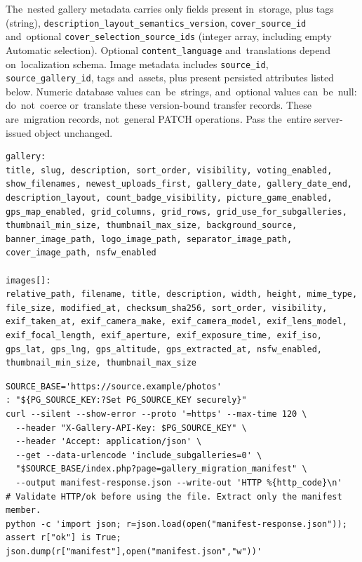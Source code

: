\documentclass[11pt,a4paper]{article}
\newcommand{\codeword}[1]{\nolinkurl{#1}}
\begin{document}
The~nested gallery metadata carries only fields present in~storage, plus tags (string),
\codeword{description_layout_semantics_version}, \codeword{cover_source_id} and~optional
\codeword{cover_selection_source_ids} (integer array, including empty Automatic selection).
Optional \codeword{content_language} and~translations depend on~localization schema. Image
metadata includes \codeword{source_id}, \codeword{source_gallery_id}, tags and~assets, plus
present persisted attributes listed below. Numeric database values can~be~strings,
and~optional values can~be~null: do~not~coerce or~translate these version-bound transfer
records. These are~migration records, not~general PATCH operations. Pass the~entire
server-issued object unchanged.

\begin{lstlisting}[language={}]
gallery:
title, slug, description, sort_order, visibility, voting_enabled,
show_filenames, newest_uploads_first, gallery_date, gallery_date_end,
description_layout, count_badge_visibility, picture_game_enabled,
gps_map_enabled, grid_columns, grid_rows, grid_use_for_subgalleries,
thumbnail_min_size, thumbnail_max_size, background_source,
banner_image_path, logo_image_path, separator_image_path,
cover_image_path, nsfw_enabled

images[]:
relative_path, filename, title, description, width, height, mime_type,
file_size, modified_at, checksum_sha256, sort_order, visibility,
exif_taken_at, exif_camera_make, exif_camera_model, exif_lens_model,
exif_focal_length, exif_aperture, exif_exposure_time, exif_iso,
gps_lat, gps_lng, gps_altitude, gps_extracted_at, nsfw_enabled,
thumbnail_min_size, thumbnail_max_size
\end{lstlisting}

\begin{lstlisting}[language={}]
SOURCE_BASE='https://source.example/photos'
: "${PG_SOURCE_KEY:?Set PG_SOURCE_KEY securely}"
curl --silent --show-error --proto '=https' --max-time 120 \
  --header "X-Gallery-API-Key: $PG_SOURCE_KEY" \
  --header 'Accept: application/json' \
  --get --data-urlencode 'include_subgalleries=0' \
  "$SOURCE_BASE/index.php?page=gallery_migration_manifest" \
  --output manifest-response.json --write-out 'HTTP %{http_code}\n'
# Validate HTTP/ok before using the file. Extract only the manifest member.
python -c 'import json; r=json.load(open("manifest-response.json")); assert r["ok"] is True; json.dump(r["manifest"],open("manifest.json","w"))'
\end{lstlisting}
\end{document}
